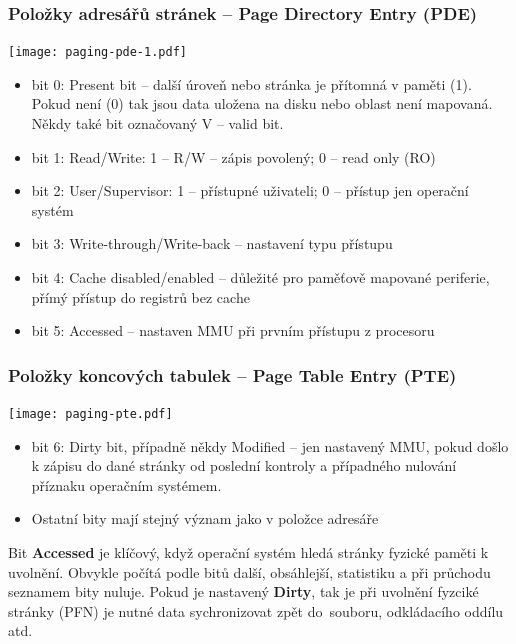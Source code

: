 \documentclass{beamer}
\begin{document}
\begin{frame}
\frametitle{Položky adresářů stránek -- \textbf{Page Directory Entry} (PDE) }

{
\centering

\texttt{[image: paging-pde-1.pdf]}

}

\vskip 2mm

\begin{itemize}
\item bit 0: Present bit -- další úroveň nebo stránka je přítomná v paměti (1). Pokud není (0) tak jsou data uložena na disku nebo oblast není mapovaná. Někdy také bit označovaný V -- valid bit.
\item bit 1: Read/Write: 1 -- R/W -- zápis povolený; 0 -- read only (RO)
\item bit 2: User/Supervisor: 1 -- přístupné uživateli; 0 -- přístup jen operační systém
\item bit 3: Write-through/Write-back -- nastavení typu přístupu
\item bit 4: Cache disabled/enabled -- důležité pro paměťově mapované periferie, přímý přístup do registrů bez cache
\item bit 5: Accessed -- nastaven MMU při prvním přístupu z procesoru
\end{itemize}

\end{frame}

\begin{frame}
\frametitle{Položky koncových tabulek -- \textbf{Page Table Entry} (PTE)}

{
\centering

\texttt{[image: paging-pte.pdf]}

}

\vskip 2mm

\begin{itemize}
\item bit 6: Dirty bit, případně někdy Modified – jen nastavený MMU, pokud došlo k zápisu do dané stránky od poslední kontroly a případného nulování příznaku operačním systémem.
\item Ostatní bity mají stejný význam jako v položce adresáře
\end{itemize}

Bit \textbf{Accessed} je klíčový, když operační systém hledá stránky fyzické paměti k uvolnění.
Obvykle počítá podle bitů další, obsáhlejší, statistiku a při průchodu seznamem bity nuluje.
Pokud je nastavený \textbf{Dirty}, tak je při uvolnění fyzciké stránky (PFN) je nutné data
sychronizovat zpět do~souboru, odkládacího oddílu atd.

\end{frame}
\end{document}
